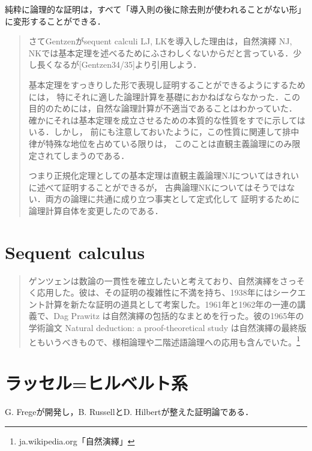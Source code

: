 \documentclass[uplatex, dvipdfmx]{jsreport}
\begin{document}
\begin{theorem}
    純粋に論理的な証明は，すべて「導入則の後に除去則が使われることがない形」に変形することができる．
\end{theorem}

\begin{quotation}
    さてGentzenがsequent calculi LJ, LKを導入した理由は，自然演繹 NJ, NKでは基本定理を述べるためにふさわしくないからだと言っている．少し長くなるが[Gentzen34/35]より引用しよう．

    基本定理をすっきりした形で表現し証明することができるようにするためには，
    特にそれに適した論理計算を基礎におかねばならなかった．この目的のためには，自然な論理計算が不適当であることはわかっていた．
    確かにそれは基本定理を成立させるための本質的な性質をすでに示してはいる．しかし，
    前にも注意しておいたように，この性質に関連して排中律が特殊な地位を占めている限りは，
    このことは直観主義論理にのみ限定されてしまうのである．

    つまり正規化定理としての基本定理は直観主義論理NJについてはきれいに述べて証明することができるが，
    古典論理NKについてはそうではない．両方の論理に共通に成り立つ事実として定式化して
    証明するために論理計算自体を変更したのである．\cite{新井敏康-Gentzen}
\end{quotation}

\section{Sequent calculus}
\begin{quote}
    ゲンツェンは数論の一貫性を確立したいと考えており、自然演繹をさっそく応用した。彼は、その証明の複雑性に不満を持ち、1938年にはシークエント計算を新たな証明の道具として考案した。1961年と1962年の一連の講義で、Dag Prawitz は自然演繹の包括的なまとめを行った。彼の1965年の学術論文 Natural deduction: a proof-theoretical study は自然演繹の最終版ともいうべきもので、様相論理や二階述語論理への応用も含んでいた。\footnote{ja.wikipedia.org「自然演繹」}
\end{quote}



\section{ラッセル=ヒルベルト系}
G. Fregeが開発し，B. RussellとD. Hilbertが整えた証明論である．
\end{document}

